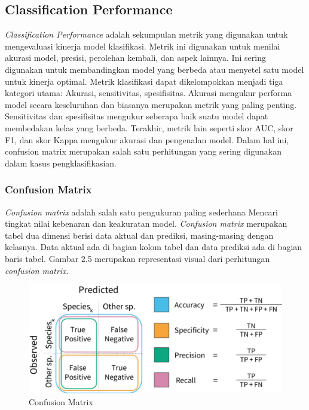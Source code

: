 \subsection{Classification Performance}
\emph{Classification Performance} adalah sekumpulan metrik yang digunakan untuk mengevaluasi kinerja model klasifikasi. Metrik ini digunakan untuk menilai akurasi model, presisi, perolehan kembali, dan aspek lainnya. Ini sering digunakan untuk membandingkan model yang berbeda atau menyetel satu model untuk kinerja optimal. Metrik klasifikasi dapat dikelompokkan menjadi tiga kategori utama: Akurasi, sensitivitas, spesifisitas. Akurasi mengukur performa model secara keseluruhan dan biasanya merupakan metrik yang paling penting. Sensitivitas dan spesifisitas mengukur seberapa baik suatu model dapat membedakan kelas yang berbeda. Terakhir, metrik lain seperti skor AUC, skor F1, dan skor Kappa mengukur akurasi dan pengenalan model.  Dalam hal ini, confusion matrix merupakan salah satu perhitungan yang sering digunakan dalam kasus
pengklasifikasian.
\subsubsection{Confusion Matrix}
\emph{Confusion matrix} adalah salah satu pengukuran paling sederhana
Mencari tingkat nilai kebenaran dan keakuratan model. \emph{Confusion matrix}
merupakan tabel dua dimensi berisi data aktual dan prediksi, masing-masing dengan kelasnya. Data aktual ada di bagian kolom tabel dan data prediksi ada di bagian baris tabel. Gambar 2.5 merupakan representasi visual dari perhitungan \emph{confusion matrix}. 
\begin{figure} [H] \centering
  \includegraphics[scale=0.3]{gambar/confusionmatrix.jpg}
  \caption{Confusion Matrix }
  \label{fig:Confusion matrix }
\end{figure}

